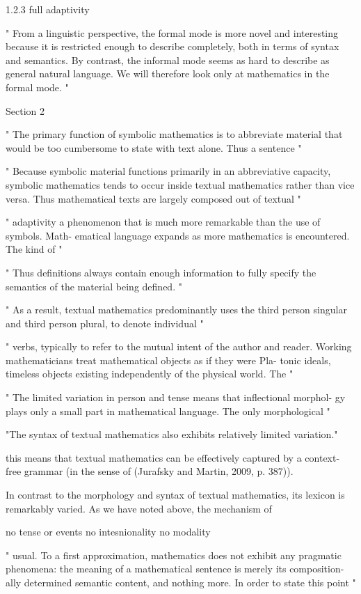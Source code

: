 1.2.3 full adaptivity


"
From a linguistic perspective, the formal mode is more novel and interesting
because it is restricted enough to describe completely, both in terms of syntax
and semantics. By contrast, the informal mode seems as hard to describe as
general natural language. We will therefore look only at mathematics in the
formal mode.
"


Section 2

"
The primary function of symbolic mathematics is to abbreviate material
that would be too cumbersome to state with text alone. Thus a sentence
"

"
Because symbolic material functions primarily in an abbreviative capacity,
symbolic mathematics tends to occur inside textual mathematics rather than
vice versa. Thus mathematical texts are largely composed out of textual
"

"
adaptivity
a phenomenon that is much more remarkable than the use of symbols. Math-
ematical language expands as more mathematics is encountered. The kind of
"

"
Thus definitions always contain enough information to fully specify the
semantics of the material being defined.
"

"
As a result, textual mathematics predominantly
uses the third person singular and third person plural, to denote individual
"

"
verbs, typically to refer to the mutual intent of the author and reader.
Working mathematicians treat mathematical objects as if they were Pla-
tonic ideals, timeless objects existing independently of the physical world. The
"

"
The limited variation in person and tense means that inflectional morphol-
gy plays only a small part in mathematical language. The only morphological
"

"The syntax of textual mathematics also exhibits relatively limited variation."


this means that textual mathematics can be effectively captured by a context-
free grammar (in the sense of (Jurafsky and Martin, 2009, p. 387)).

In contrast to the morphology and syntax of textual mathematics, its
lexicon is remarkably varied. As we have noted above, the mechanism of

no tense or events
no intesnionality
no modality

"
usual. To a first approximation, mathematics does not exhibit any pragmatic
phenomena: the meaning of a mathematical sentence is merely its composition-
ally determined semantic content, and nothing more. In order to state this point
"


